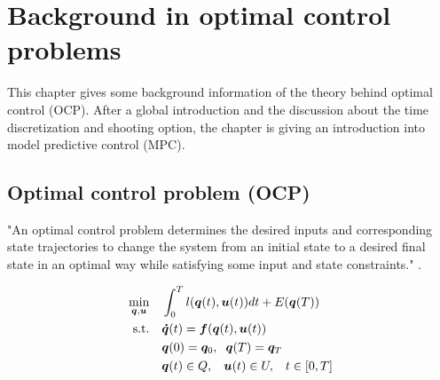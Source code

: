 \chapter{Background in optimal control problems}
\label{cha:OCP}

This chapter gives some background information of the theory behind optimal control (OCP). After a global introduction and the discussion about the time discretization and shooting option, the chapter is giving an introduction into model predictive control (MPC).

\section{Optimal control problem (OCP)}
\label{Optimal control problem (OCP)}
"An optimal control problem determines the desired inputs and corresponding state trajectories to change the system from an initial state to a desired final state in an optimal way while satisfying some input and state constraints." \cite{Mercy2018}.

\begin{equation}
\label{eq:OCP}
\begin{aligned}
\min_{\bm{q},\bm{u}} \quad & \int_{0}^{T}l(\bm{q}(t),\bm{u}(t))dt + E(\bm{q}(T)) \\
\textrm{s.t.} \quad & \bm{\dot{q}}(t) = \bm{f}(\bm{q}(t), \bm{u}(t))\\
& \bm{q}(0)= \bm{q}_{0},\hspace{2 mm}\bm{q}(T)= \bm{q}_{T}    \\
& \bm{q}(t)\in Q,\hspace{3 mm} \bm{u}(t)\in U, \hspace{3 mm} t\in [0, T]
\end{aligned}
\end{equation}

